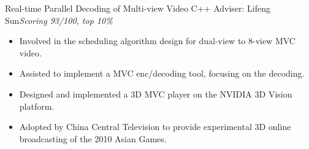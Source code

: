 \documentclass[10pt,a4paper]{moderncv/moderncv}
\begin{document}
{Real-time Parallel Decoding of Multi-view Video}
{C++}
{Adviser: Lifeng Sun}{\textit{Scoring 93/100, top 10\%}}
{
\begin{itemize}
	\item Involved in the scheduling algorithm design for dual-view to 8-view MVC video.
	\item Assisted to implement a MVC enc/decoding tool, focusing on the decoding.
	\item Designed and implemented a 3D MVC player on the NVIDIA 3D Vision platform.
	\item Adopted by China Central Television to provide experimental 3D online broadcasting of the 2010 Asian Games.
\end{itemize}
}



\end{document}
